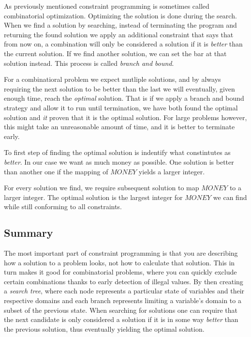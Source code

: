 As previously mentioned constraint programming is sometimes called combinatorial optimization.
Optimizing the solution is done during the search. When we find a solution by searching,
instead of terminating the program and returning the found solution we apply an additional
constraint that says that from now on, a combination will only be considered a solution
if it is \textit{better} than the current solution. If we find another solution, we can
set the bar at that solution instead. This process is called \textit{branch and bound}.

For a combinatioral problem we expect mutliple solutions, and by always requiring the
next solution to be better than the last we will eventually, given enough time, reach
the \textit{optimal} solution. That is if we apply a branch and bound strategy and allow
it to run until termination, we have both found the optimal solution and \textit{it} proven
that it is the optimal solution. For large problems however, this might take an unreasonable
amount of time, and it is better to terminate early.

To first step of finding the optimal solution is indentify what constintutes as \textit{
	better}. In our case we want as much money as possible. One solution is better than
another one if the mapping of $MONEY$ yields a larger integer.

For every solution we find, we require subsequent solution to map $MONEY$ to a larger
integer. The optimal solution is the largest integer for $MONEY$ we can find while still
conforming to all constraints.



\subsection{Summary}
The most important part of constraint programming is that you are describing how a
solution to a problem looks, not how to calculate that solution. This in turn makes it
good for combinatorial problems, where you can quickly exclude certain combinations thanks
to early detection of illegal values. By then creating a \textit{search tree}, where each
node represents a particular state of variables and their respective domains and each
branch represents limiting a variable's domain to a subset of the previous state. When
searching for solutions one can require that the next candidate is only considered a solution
if it is in some way \textit{better} than the previous solution, thus eventually yielding
the optimal solution.
